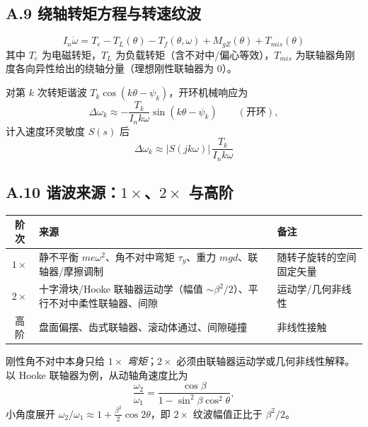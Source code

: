 \subsection*{A.9 绕轴转矩方程与转速纹波}

\begin{equation}
\boxed{\;I_n\dot\omega=T_e-T_L(\theta)-T_f(\theta,\omega)+M_{gZ}(\theta)+T_{mis}(\theta)\;}
\label{eq:app-torque}
\end{equation}
其中 $T_e$ 为电磁转矩，$T_L$ 为负载转矩（含不对中/偏心等效），$T_{mis}$ 为联轴器角刚度各向异性给出的绕轴分量（理想刚性联轴器为 $0$）。

对第 $k$ 次转矩谐波 $T_k\cos(k\theta-\psi_k)$，开环机械响应为
\begin{equation}
\Delta\omega_k\approx-\frac{T_k}{I_nk\omega}\sin(k\theta-\psi_k)\qquad(\text{开环}),
\end{equation}
计入速度环灵敏度 $S(s)$ 后
\begin{equation}
\boxed{\;\Delta\omega_k\approx|S(jk\omega)|\,\frac{T_k}{I_nk\omega}\;}
\label{eq:app-dw}
\end{equation}

\subsection*{A.10 谐波来源：$1\times$、$2\times$ 与高阶}

\begin{center}\footnotesize
\begin{tabular}{@{}cll@{}}
\toprule
阶次 & 来源 & 备注\\
\midrule
$1\times$ & 静不平衡 $me\omega^2$、角不对中弯矩 $\tau_y$、重力 $mgd$、联轴器/摩擦调制 & 随转子旋转的空间固定矢量\\
$2\times$ & 十字滑块/Hooke 联轴器运动学（幅值 $\sim\beta^2/2$）、平行不对中柔性联轴器、间隙 & 运动学/几何非线性\\
高阶 & 盘面偏摆、齿式联轴器、滚动体通过、间隙碰撞 & 非线性接触\\
\bottomrule
\end{tabular}
\end{center}

刚性角不对中本身只给 $1\times$ \emph{弯矩}；$2\times$ 必须由联轴器运动学或几何非线性解释。以 Hooke 联轴器为例，从动轴角速度比为
\begin{equation}
\frac{\omega_2}{\omega_1}=\frac{\cos\beta}{1-\sin^2\beta\cos^2\theta},
\end{equation}
小角度展开 $\omega_2/\omega_1\approx1+\frac{\beta^2}{2}\cos2\theta$，即 $2\times$ 纹波幅值正比于 $\beta^2/2$。

